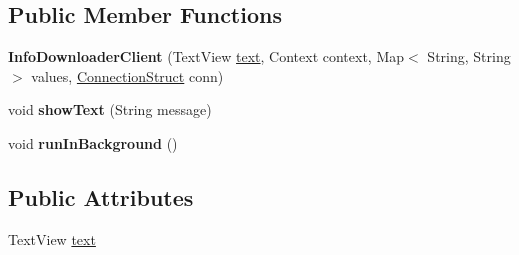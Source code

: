 \subsection*{Public Member Functions}
\begin{DoxyCompactItemize}
\item 
{\bfseries Info\+Downloader\+Client} (Text\+View \hyperlink{classcom_1_1example_1_1sebastian_1_1tindertp_1_1internetTools_1_1InfoDownloaderClient_af7bc063a43057f8926845d9d0b636ca6}{text}, Context context, Map$<$ String, String $>$ values, \hyperlink{classcom_1_1example_1_1sebastian_1_1tindertp_1_1commonTools_1_1ConnectionStruct}{Connection\+Struct} conn)\hypertarget{classcom_1_1example_1_1sebastian_1_1tindertp_1_1internetTools_1_1InfoDownloaderClient_a747d5511c8f058d445ceb1177b44f9d3}{}\label{classcom_1_1example_1_1sebastian_1_1tindertp_1_1internetTools_1_1InfoDownloaderClient_a747d5511c8f058d445ceb1177b44f9d3}

\item 
void {\bfseries show\+Text} (String message)\hypertarget{classcom_1_1example_1_1sebastian_1_1tindertp_1_1internetTools_1_1InfoDownloaderClient_acbbb215c97cd0f0d90be7543d6fb5c99}{}\label{classcom_1_1example_1_1sebastian_1_1tindertp_1_1internetTools_1_1InfoDownloaderClient_acbbb215c97cd0f0d90be7543d6fb5c99}

\item 
void {\bfseries run\+In\+Background} ()\hypertarget{classcom_1_1example_1_1sebastian_1_1tindertp_1_1internetTools_1_1InfoDownloaderClient_abb73f39b841d14e1ab56e1dd090cac1a}{}\label{classcom_1_1example_1_1sebastian_1_1tindertp_1_1internetTools_1_1InfoDownloaderClient_abb73f39b841d14e1ab56e1dd090cac1a}

\end{DoxyCompactItemize}
\subsection*{Public Attributes}
\begin{DoxyCompactItemize}
\item 
Text\+View \hyperlink{classcom_1_1example_1_1sebastian_1_1tindertp_1_1internetTools_1_1InfoDownloaderClient_af7bc063a43057f8926845d9d0b636ca6}{text}
\end{DoxyCompactItemize}
